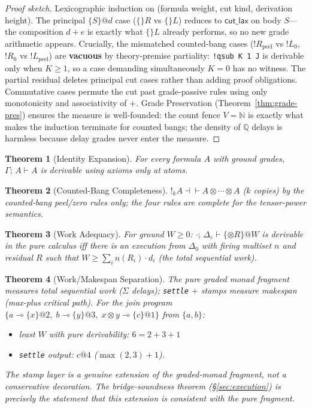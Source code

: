 \documentclass[11pt]{article}
\makeatletter
\newcommand{\loli}{\multimap}                   %
\newcommand{\tensor}{\otimes}                   %
\newcommand{\laxm}[2]{\{#1\}@{#2}}
\newcommand{\N}{\mathbb{N}}
\newcommand{\Q}{\mathbb{Q}}
\newtheorem{theorem}{Theorem}[section]
\theoremstyle{remark}
\makeatother
\begin{document}
\begin{proof}[Proof sketch]
Lexicographic induction on (formula weight, cut kind, derivation height).  The
principal $\laxm{S}{d}$ case ($\{\}R$ vs $\{\}L$) reduces to $\mathsf{cut\_lax}$
on body $S$---the composition $d + e$ is exactly what $\{\}L$ already performs,
so no new grade arithmetic appears.  Crucially, the mismatched counted-bang cases
($!R_{\mathrm{peel}}$ vs $!L_0$, $!R_0$ vs $!L_{\mathrm{peel}}$) are
\textbf{vacuous} by theory-premise partiality: \texttt{!qsub K 1 J} is derivable
only when $K \geq 1$, so a case demanding simultaneously $K = 0$ has no witness.
The partial residual deletes principal cut cases rather than adding proof
obligations.  Commutative cases permute the cut past grade-passive rules using
only monotonicity and associativity of $+$.  Grade Preservation
(Theorem~\ref{thm:grade-pres}) ensures the measure is well-founded: the count
fence $V = \N$ is exactly what makes the induction terminate for counted bangs;
the density of $\Q$ delays is harmless because delay grades never enter the
measure.
\end{proof}

\begin{theorem}[Identity Expansion]
For every formula $A$ with ground grades, $\Gamma;\,A \vdash A$ is derivable
using axioms only at atoms.
\end{theorem}

\begin{theorem}[Counted-Bang Completeness]
$!_k A \dashv\vdash A \tensor \cdots \tensor A$ ($k$ copies) by the
counted-bang peel/zero rules only; the four rules are complete for the
tensor-power semantics.
\end{theorem}

\begin{theorem}[Work Adequacy]
For ground $W \geq 0$: $\cdot;\,\Delta_\varepsilon \vdash \laxm{\tensor R}{W}$
is derivable in the pure calculus iff there is an execution from $\Delta_0$ with
firing multiset $n$ and residual $R$ such that $W \geq \sum_i n(R_i) \cdot d_i$
(the total sequential work).
\end{theorem}

\begin{theorem}[Work/Makespan Separation]
The pure graded monad fragment measures total sequential work ($\Sigma$ delays);
\texttt{settle} $+$ stamps measure makespan (max-plus critical path).  For the
join program $\{a \loli \laxm{x}{2},\; b \loli \laxm{y}{3},\; x \tensor y \loli
\laxm{c}{1}\}$ from $\{a, b\}$:
\begin{itemize}
\item least $W$ with pure derivability: $6 = 2 + 3 + 1$
\item \texttt{settle} output: $c@4$ ($\max(2,3) + 1$).
\end{itemize}
The stamp layer is a genuine extension of the graded-monad fragment, not a
conservative decoration.  The bridge-soundness theorem (\S\ref{sec:execution}) is
precisely the statement that this extension is consistent with the pure fragment.
\end{theorem}
\end{document}
